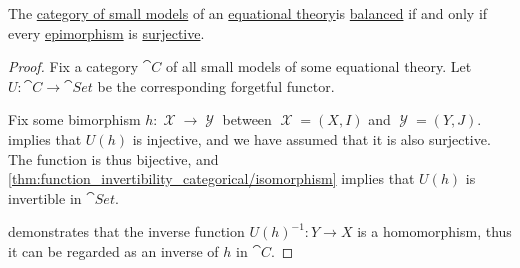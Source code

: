 \begin{corollary}\label{thm:fol_equational_theory_balanced_category}
  The \hyperref[def:fol_theory_model_functor/obj]{category of small models} of an \hyperref[def:fol_equational_theory]{equational theory}is \hyperref[def:balanced_category]{balanced} if and only if every \hyperref[def:morphism_cancellation/right]{epimorphism} is \hyperref[def:function_invertibility/surjective]{surjective}.
\end{corollary}
\begin{proof}
  Fix a category \( \cat{C} \) of all small models of some equational theory. Let \( U: \cat{C} \to \cat{Set} \) be the corresponding forgetful functor.

  Fix some bimorphism \( h: \mscrX \to \mscrY \) between \( \mscrX = (X, I) \) and \( \mscrY = (Y, J) \).  implies that \( U(h) \) is injective, and we have assumed that it is also surjective. The function is thus bijective, and \cref{thm:function_invertibility_categorical/isomorphism} implies that \( U(h) \) is invertible in \( \cat{Set} \).

   demonstrates that the inverse function \( U(h)^{-1}: Y \to X \) is a homomorphism, thus it can be regarded as an inverse of \( h \) in \( \cat{C} \).
\end{proof}


